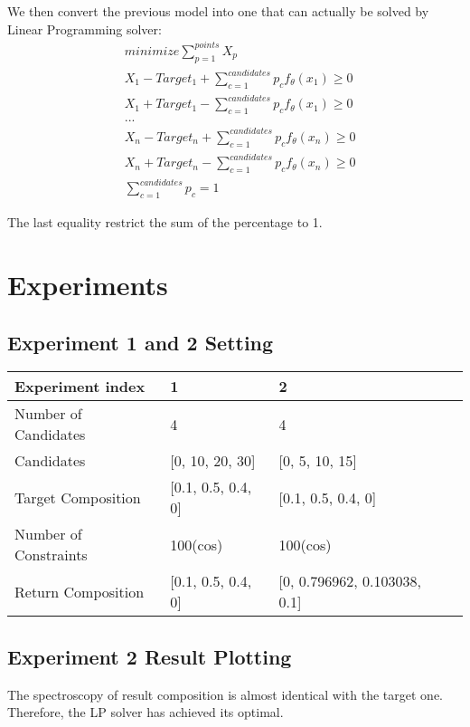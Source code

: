 We then convert the previous model into one that can actually be solved by Linear Programming solver:\\

\begin{eqnarray} 
& minimize \displaystyle\sum^{points}_{p=1} X_p \nonumber \\
& X_1 - Target_1 + \displaystyle\sum^{candidates}_{c=1}p_{c}f_{\theta}(x_1) \geq 0 \nonumber \\
& X_1 + Target_1 - \displaystyle\sum^{candidates}_{c=1}p_{c}f_{\theta}(x_1) \geq 0 \nonumber \\
& ... \nonumber \\
& X_n - Target_n + \displaystyle\sum^{candidates}_{c=1}p_{c}f_{\theta}(x_n) \geq 0 \nonumber \\
& X_n + Target_n - \displaystyle\sum^{candidates}_{c=1}p_{c}f_{\theta}(x_n) \geq 0 \nonumber \\
& \displaystyle\sum^{candidates}_{c=1}p_{c} = 1 \nonumber
\end{eqnarray} 

The last equality restrict the sum of the percentage to 1.



  

\section{Experiments}

\subsection{Experiment 1 and 2 Setting}
\begin{table}
\begin{tabular}{l | l | l | l }
\hline
Experiment index & 1 & 2  \\
\hline
Number of Candidates & 4 & 4  \\
\hline
Candidates & [0, 10, 20, 30] & [0, 5, 10, 15] \\
\hline
Target Composition & [0.1, 0.5, 0.4, 0] & [0.1, 0.5, 0.4, 0]     \\
\hline
Number of Constraints & 100(cos) &  100(cos)     \\
\hline
Return Composition & [0.1, 0.5, 0.4, 0] & [0, 0.796962, 0.103038, 0.1] \\
\hline
\end{tabular} 
\end{table}	

\subsection{Experiment 2 Result Plotting}
The spectroscopy of result composition is almost identical with the target one. Therefore, the LP solver has achieved its optimal.


